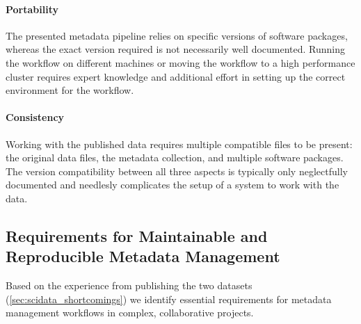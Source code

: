 \paragraph{Portability} The presented metadata pipeline relies on specific versions of software packages, whereas the exact version required is not necessarily well documented. Running the workflow on different machines or moving the workflow to a high performance cluster requires expert knowledge and additional effort in setting up the correct environment for the workflow.

\paragraph{Consistency} Working with the published data requires multiple compatible files to be present: the original data files, the metadata collection, and multiple software packages. The version compatibility between all three aspects is typically only neglectfully documented and needlesly complicates the setup of a system to work with the data.



\subsection{Requirements for Maintainable and Reproducible Metadata Management}
\label{sec:metadata_requirements}
Based on the experience from publishing the two datasets (\ref{sec:scidata_shortcomings}) we identify essential requirements for metadata management workflows in complex, collaborative projects.

